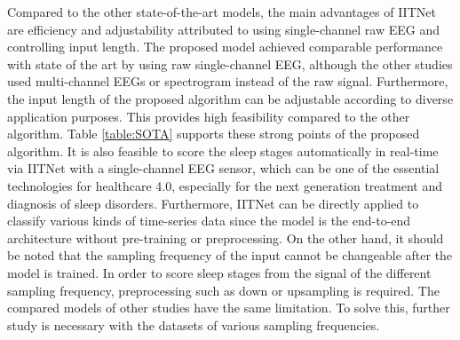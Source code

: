 \documentclass[10pt,twocolumn,twoside]{IEEEtran}
\begin{document}
    Compared to the other state-of-the-art models, the main advantages of IITNet are efficiency and adjustability attributed to using single-channel raw EEG and controlling input length. The proposed model achieved comparable performance with state of the art by using raw single-channel EEG, although the other studies used multi-channel EEGs or spectrogram instead of the raw signal. Furthermore, the input length of the proposed algorithm can be adjustable according to diverse application purposes. This provides high feasibility compared to the other algorithm. Table \ref{table:SOTA} supports these strong points of the proposed algorithm. It is also feasible to score the sleep stages automatically in real-time via IITNet with a single-channel EEG sensor, which can be one of the essential technologies for healthcare 4.0, especially for the next generation treatment and diagnosis of sleep disorders. Furthermore, IITNet can be directly applied to classify various kinds of time-series data since the model is the end-to-end architecture without pre-training or preprocessing. On the other hand, it should be noted that the sampling frequency of the input cannot be changeable after the model is trained. In order to score sleep stages from the signal of the different sampling frequency, preprocessing such as down or upsampling is required. The compared models of other studies have the same limitation. To solve this, further study is necessary with the datasets of various sampling frequencies.
\end{document}
